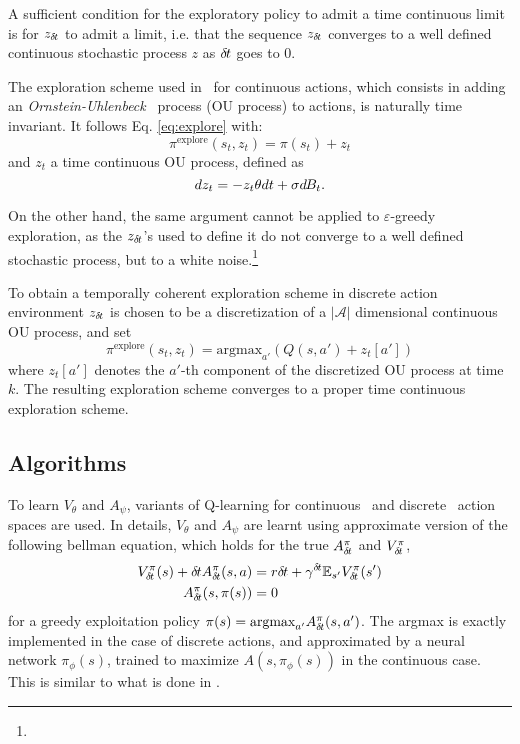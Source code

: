 A sufficient condition for the exploratory policy to admit a time continuous
limit is for
$z_{\delta\hspace{-.1em}t}$ to admit a limit, i.e. that the sequence $z_{\delta\hspace{-.1em}t}$ converges to a
well defined continuous stochastic process $z$ as ${\delta\hspace{-.1em}t}$ goes to $0$.

The exploration scheme used in~\cite{ddpg} for continuous actions, which consists in adding an
\emph{Ornstein-Uhlenbeck}~\cite{orn-uhl} process (OU process) to actions, is naturally time
invariant. It follows Eq. \eqref{eq:explore} with:
\begin{equation}
	\pi^\text{explore}(s_t, z_t) = \pi(s_t) + z_t
\end{equation}
and $z_t$ a time continuous OU process, defined as
\begin{equation}
	dz_t = - z_t \theta dt + \sigma d\hspace{-.1em}B_t.
	\label{eq:orn_uhl}
\end{equation}

On the other hand, the same argument cannot be applied to $\varepsilon$-greedy
exploration, as the $z_{\delta\hspace{-.1em}t}$'s used to define it do not converge to a 
well defined stochastic process, but to a white noise.\footnote{}

To obtain a temporally coherent exploration scheme in discrete action environment
$z_{\delta\hspace{-.1em}t}$ is chosen to be a discretization of a $|\mathcal{A}|$ dimensional
continuous OU process, and set
\begin{equation}
  \pi^\text{explore}(s_t, z_t)= \text{argmax}_{a'} \left(Q(s, a') + z_t[a']\right)
\end{equation}
where $z_t[a']$ denotes the $a'$-th component of the discretized OU process at time
$k$. The resulting exploration scheme converges to a proper time continuous exploration scheme.

\subsection{Algorithms}
\label{subsec:algorithm}
To learn $V_{\theta}$ and $A_{\psi}$, variants of Q-learning for continuous~\cite{ddpg} and
discrete~\cite{dqn} action spaces are used. In details, $V_{\theta}$ and $A_{\psi}$ are learnt
using approximate version of the following bellman equation, which holds for the true $A^\pi_{\delta\hspace{-.1em}t}$
and $V^\pi_{\delta\hspace{-.1em}t}$,
\begin{align}
	V^{\pi}_{\delta\hspace{-.1em}t}(s) + {\delta\hspace{-.1em}t} A^{\pi}_{\delta\hspace{-.1em}t}(s, a) &= r{\delta\hspace{-.1em}t} + \gamma^{{\delta\hspace{-.1em}t}}  \mathbb{E}_{s'} V^{\pi}_{\delta\hspace{-.1em}t}(s')\label{eq:bellman_A}\\
	A^{\pi}_{\delta\hspace{-.1em}t}(s, \pi(s)) &= 0\label{eq:max_A}
\end{align}
for a greedy exploitation policy $\pi(s) = \text{argmax}_{a'}A^\pi_{\delta\hspace{-.1em}t}(s,
a')$. The argmax is exactly implemented in the case of discrete actions, and approximated by
a neural network $\pi_\phi(s)$, trained to maximize
$A(s, \pi_\phi(s))$ in the continuous case.  This is similar to what is done in \cite{ddpg}.

